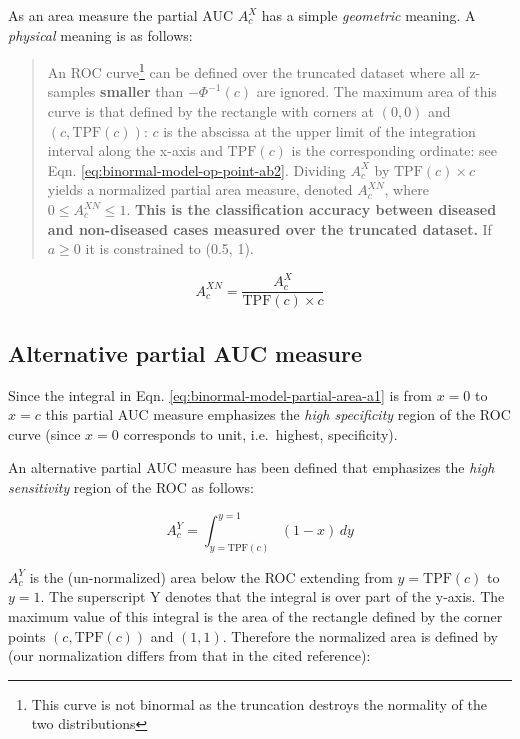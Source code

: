 \documentclass[
]{book}
\begin{document}
As an area measure the partial AUC \(A_c^{X}\) has a simple \emph{geometric} meaning. A \emph{physical} meaning is as follows:

\begin{quote}
An ROC curve\footnote{This curve is not binormal as the truncation destroys the normality of the two distributions} can be defined over the truncated dataset where all z-samples \textbf{smaller} than \(-\Phi^{-1}(c)\) are ignored. The maximum area of this curve is that defined by the rectangle with corners at \((0,0)\) and \((c,\text{TPF}\left ( c \right ))\): \(c\) is the abscissa at the upper limit of the integration interval along the x-axis and \(\text{TPF}\left ( c \right )\) is the corresponding ordinate: see Eqn. \eqref{eq:binormal-model-op-point-ab2}. Dividing \(A_c^{X}\) by \(\text{TPF}\left ( c \right ) \times c\) yields a normalized partial area measure, denoted \(A_c^{XN}\), where \(0 \le A_c^{XN} \le 1\). \textbf{This is the classification accuracy between diseased and non-diseased cases measured over the truncated dataset.} If \(a \ge 0\) it is constrained to (0.5, 1).
\end{quote}

\begin{equation}
A_c^{XN} = \frac{A_c^{X}}{\text{TPF}\left ( c \right ) \times c}
\label{eq:binormal-model-normalized-partial-auc}
\end{equation}

\hypertarget{binormal-model-metz-partial-auc}{%
\subsection{Alternative partial AUC measure}\label{binormal-model-metz-partial-auc}}

Since the integral in Eqn. \eqref{eq:binormal-model-partial-area-a1} is from \(x = 0\) to \(x = c\) this partial AUC measure emphasizes the \emph{high specificity} region of the ROC curve (since \(x = 0\) corresponds to unit, i.e.~highest, specificity).

An alternative partial AUC measure has been defined \citep{jiang1996receiver} that emphasizes the \emph{high sensitivity} region of the ROC as follows:

\begin{equation} 
A_c^{Y} = \int_{y=\text{TPF}(c)}^{y=1} \left (1-x  \right ) \, dy
\label{eq:binormal-model-partial-area-ac-metz}
\end{equation}

\(A_c^{Y}\) is the (un-normalized) area below the ROC extending from \(y = \text{TPF}(c)\) to \(y = 1\). The superscript Y denotes that the integral is over part of the y-axis. The maximum value of this integral is the area of the rectangle defined by the corner points \((c,\text{TPF}(c))\) and \((1,1)\). Therefore the normalized area is defined by (our normalization differs from that in the cited reference):
\end{document}
